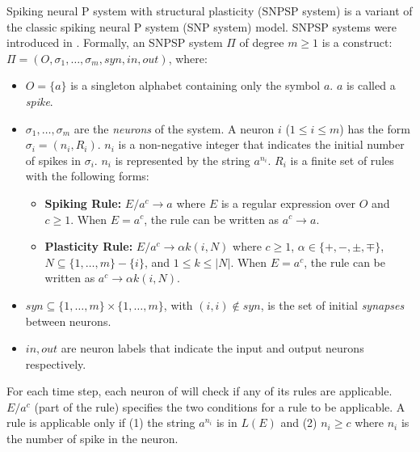 \documentclass[runningheads,a4paper]{llncs}
\begin{document}
Spiking neural P system with structural plasticity (SNPSP system) is a variant of the classic spiking neural P system (SNP system) model. SNPSP 
systems were introduced in \cite{SNPSP}. Formally, an SNPSP system $\Pi$ of degree $m \geq 1$ is  {a} construct: $\Pi =(O, \sigma_1,\ldots, \sigma_m, 
syn, in, out)$, where:

\begin{itemize}[label=$\circ$]
   \item  $O = \{a\}$ is a singleton alphabet containing only the symbol $a$. $a$ is called a \textit{spike}.
   \item $\sigma_1, \ldots, \sigma_m$ are the \textit{neurons} of the system. A neuron $i$ ($1 \leq i \leq m$) has the form $\sigma_i = (n_i, R_i)$. 
          $n_i$ is a non-negative integer that indicates the initial number of spikes in $\sigma_i$. $n_i$ is represented by the string $a^{n_i}$. 
          $R_i$ is a finite set of rules with the following forms:
          \begin{itemize}
             \item \textbf{Spiking Rule:} $E/a^c \rightarrow a$ where $E$ is a regular expression over $O$ and $c \geq 1$. When $E=a^c$, the rule can 
                   be written as $a^c \rightarrow a$.
             \item \textbf{Plasticity Rule:} $E/a^c \rightarrow \alpha k(i,N)$ where $c \geq 1$, $\alpha \in \{+,-,\pm,\mp\}$, $N \subseteq \{1,
                   \ldots,m\}-\{i\}$, and  $1 \leq k \leq |N|$. When $E=a^c$, the rule can be written as $a^c \rightarrow \alpha k(i,N)$.
          \end{itemize}
   \item $syn \subseteq \{1,\ldots,m\} \times \{1,\ldots,m\}$, with $(i,i) \not\in syn$, is the set of initial \textit{synapses} between neurons.
   \item $in,out$ are neuron labels that indicate the input and output neurons respectively.
\end{itemize}
  

 
For each time step, each neuron of will check if any of its rules are applicable. $E/a^c$ (part of the rule) specifies the two conditions for a rule
to be applicable. A rule is applicable only if (1) the string $a^{n_i}$ is in $L(E)$ and  (2) $n_i \geq c$ where $n_i$ is the number of spike in the
neuron.
\end{document}
